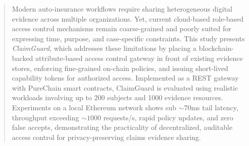 \documentclass[conference]{IEEEtran}
\begin{document}
\begin{abstract}
Modern auto-insurance workflows require sharing heterogeneous digital evidence across multiple organizations. Yet, current cloud-based role-based access control mechanisms remain coarse-grained and poorly suited for expressing time, purpose, and case-specific constraints. This study presents \emph{ClaimGuard}, which addresses these limitations by placing a blockchain-backed attribute-based access control gateway in front of existing evidence stores, enforcing fine-grained on-chain policies, and issuing short-lived capability tokens for authorized access. Implemented as a REST gateway with PureChain smart contracts, ClaimGuard is evaluated using realistic workloads involving up to 200 subjects and 1000 evidence resources. Experiments on a local Ethereum network shows sub ${\sim}70$ms tail latency, throughput exceeding ${\sim}1000$ requests/s, rapid policy updates, and zero false accepts, demonstrating the practicality of decentralized, auditable access control for privacy-preserving claims evidence sharing.

\end{abstract}
\end{document}
